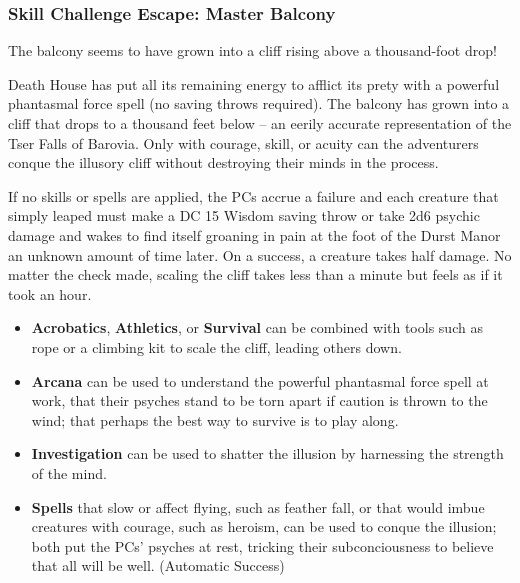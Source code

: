 \subsubsection*{Skill Challenge Escape: Master Balcony}
\label{sec:SC_MasterBalcony}
\begin{readout}
  The balcony seems to have grown into a cliff rising above a thousand-foot drop!
\end{readout}
Death House has put all its remaining energy to afflict its prety with a powerful phantasmal force spell (no
saving throws required). The balcony has grown into a cliff that drops to a thousand feet below -- an eerily 
accurate representation of the Tser Falls of Barovia. Only with courage, skill, or acuity can the adventurers
conque the illusory cliff without destroying their minds in the process.

If no skills or spells are applied, the PCs accrue a failure and each creature that simply leaped must make a
DC 15 Wisdom saving throw or take 2d6 psychic damage and wakes to find itself groaning in pain at the foot of 
the Durst Manor an unknown amount of time later. On a success, a creature takes half damage. No matter the check
made, scaling the cliff takes less than a minute but feels as if it took an hour.
\begin{skillChallenge}
  \begin{itemize}
    \item \textbf{Acrobatics}, \textbf{Athletics}, or \textbf{Survival} can be combined with tools such as rope
    or a climbing kit to scale the cliff, leading others down. \moderateDC
    \item \textbf{Arcana} can be used to understand the powerful phantasmal force spell at work, that their
    psyches stand to be torn apart if caution is thrown to the wind; that perhaps the best way to survive is
    to play along. \moderateDC
    \item \textbf{Investigation} can be used to shatter the illusion by harnessing the strength of the mind.
    \hardDC
    \item \textbf{Spells} that slow or affect flying, such as feather fall, or that would imbue creatures with
    courage, such as heroism, can be used to conque the illusion; both put the PCs' psyches at rest, tricking
    their subconciousness to believe that all will be well. (Automatic Success)
  \end{itemize}
\end{skillChallenge}

\begin{arealinks}
  \item {}
\end{arealinks}


